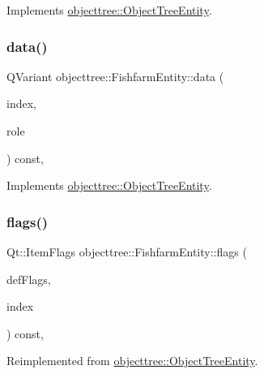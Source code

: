 Implements \mbox{\hyperlink{classobjecttree_1_1_object_tree_entity_a70fd25eccf88b305e9db15fbe3daeae8}{objecttree\+::\+Object\+Tree\+Entity}}.

\mbox{\label{classobjecttree_1_1_fishfarm_entity_aacaf463406fb39561982ff90c68d9e75}} 
\subsubsection{\texorpdfstring{data()}{data()}}
{\footnotesize\ttfamily Q\+Variant objecttree\+::\+Fishfarm\+Entity\+::data (\begin{DoxyParamCaption}\item[{const Q\+Model\+Index \&}]{index,  }\item[{int}]{role }\end{DoxyParamCaption}) const\hspace{0.3cm}{\ttfamily [override]}, {\ttfamily [virtual]}}



Implements \mbox{\hyperlink{classobjecttree_1_1_object_tree_entity_a2413c6573de18b451d97eb3800f10f35}{objecttree\+::\+Object\+Tree\+Entity}}.

\mbox{\label{classobjecttree_1_1_fishfarm_entity_ac474b5816c70facd1ea6da26b0678b91}} 
\subsubsection{\texorpdfstring{flags()}{flags()}}
{\footnotesize\ttfamily Qt\+::\+Item\+Flags objecttree\+::\+Fishfarm\+Entity\+::flags (\begin{DoxyParamCaption}\item[{Qt\+::\+Item\+Flags}]{def\+Flags,  }\item[{const Q\+Model\+Index \&}]{index }\end{DoxyParamCaption}) const\hspace{0.3cm}{\ttfamily [override]}, {\ttfamily [virtual]}}



Reimplemented from \mbox{\hyperlink{classobjecttree_1_1_object_tree_entity_a71042bfb5a8328bcbde9d283c0b1b28c}{objecttree\+::\+Object\+Tree\+Entity}}.

